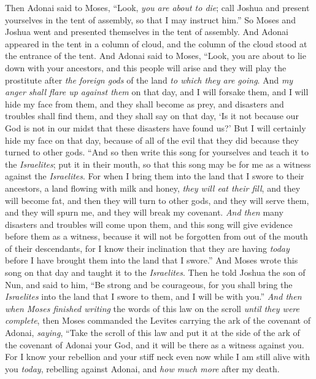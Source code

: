 \begin{biblechapter}
\verse Then Adonai said to Moses, “Look, \textit{you are about to die}; call Joshua and present yourselves in the tent of assembly, so that I may instruct him.” So Moses and Joshua went and presented themselves in the tent of assembly.
\verse And Adonai appeared in the tent in a column of cloud, and the column of the cloud stood at the entrance of the tent.
\verse And Adonai said to Moses, “Look, you are about to lie down with your ancestors, and this people will arise and they will play the prostitute after \textit{the foreign gods} of the land \textit{to which they are going}.
\verse And \textit{my anger shall flare up against them} on that day, and I will forsake them, and I will hide my face from them, and they shall become as prey, and disasters and troubles shall find them, and they shall say on that day, ‘Is it not because our God is not in our midst that these disasters have found us?’
\verse But I will certainly hide my face on that day, because of all of the evil that they did because they turned to other gods.
\verse “And so then write this song for yourselves and teach it to the \textit{Israelites}; put it in their mouth, so that this song may be for me as a witness against the \textit{Israelites}.
\verse For when I bring them into the land that I swore to their ancestors, a land flowing with milk and honey, \textit{they will eat their fill}, and they will become fat, and then they will turn to other gods, and they will serve them, and they will spurn me, and they will break my covenant.
\verse \textit{And then} many disasters and troubles will come upon them, and this song will give evidence before them as a witness, because it will not be forgotten from out of the mouth of their descendants, for I know their inclination that they are having \textit{today} before I have brought them into the land that I swore.”
\verse And Moses wrote this song on that day and taught it to the \textit{Israelites}.
\verse Then he told Joshua the son of Nun, and said to him, “Be strong and be courageous, for you shall bring the \textit{Israelites} into the land that I swore to them, and I will be with you.”
\verse \textit{And then when Moses finished writing} the words of this law on the scroll \textit{until they were complete},
\verse then Moses commanded the Levites carrying the ark of the covenant of Adonai, \textit{saying},
\verse “Take the scroll of this law and put it at the side of the ark of the covenant of Adonai your God, and it will be there as a witness against you.
\verse For I know your rebellion and your stiff neck even now while I am still alive with you \textit{today}, rebelling against Adonai, and \textit{how much more} after my death.

\end{biblechapter}
